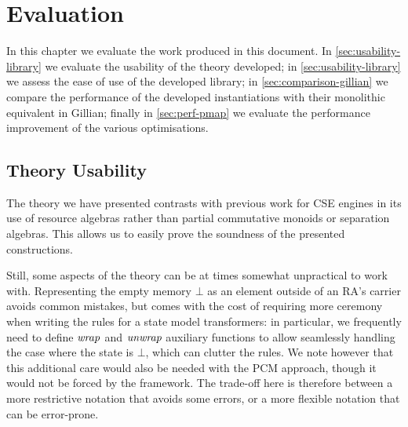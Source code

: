 \chapter{Evaluation} \label{chap:evaluation}

In this chapter we evaluate the work produced in this document. In \cref{sec:usability-library} we evaluate the usability of the theory developed; in \cref{sec:usability-library} we assess the ease of use of the developed library; in \cref{sec:comparison-gillian} we compare the performance of the developed instantiations with their monolithic equivalent in Gillian; finally in \cref{sec:perf-pmap} we evaluate the performance improvement of the various \PMap{} optimisations.

\section{Theory Usability} \label{sec:usability-theory}

The theory we have presented contrasts with previous work for CSE engines in its use of resource algebras rather than partial commutative monoids or separation algebras. This allows us to easily prove the soundness of the presented constructions.

Still, some aspects of the theory can be at times somewhat unpractical to work with. Representing the empty memory $\bot$ as an element outside of an RA's carrier avoids common mistakes, but comes with the cost of requiring more ceremony when writing the rules for a state model transformers: in particular, we frequently need to define ${\operatorname{\mathit{wrap}}}$ and ${\operatorname{\mathit{unwrap}}}$ auxiliary functions to allow seamlessly handling the case where the state is $\bot$, which can clutter the rules. We note however that this additional care would also be needed with the PCM approach, though it would not be forced by the framework. The trade-off here is therefore between a more restrictive notation that avoids some errors, or a more flexible notation that can be error-prone.


